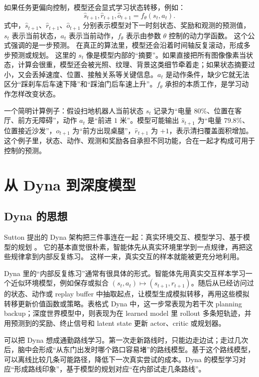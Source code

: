 \documentclass[11pt,a4paper]{ctexart}
\begin{document}
如果任务更偏向控制，模型还会显式学习状态转移，例如：
\begin{equation}
  \hat{s}_{t+1}, \hat{r}_{t+1}, \hat{o}_{t+1} = f_\theta(s_t, a_t).
\end{equation}
式中，$\hat{s}_{t+1}$、$\hat{r}_{t+1}$、$\hat{o}_{t+1}$ 分别表示模型对下一时刻状态、奖励和观测的预测值，$s_t$ 表示当前状态，$a_t$ 表示当前动作，$f_\theta$ 表示由参数 $\theta$ 控制的动力学函数。
这个公式强调的是一步预测。
在真正的算法里，模型还会沿着时间轴反复滚动，形成多步预测或规划。
这里的 $s_t$ 像是模型内部的“摘要”。如果直接把所有图像像素当状态，计算会很重，模型还会被光照、纹理、背景这类细节牵着走；如果状态摘要过小，又会丢掉速度、位置、接触关系等关键信息。$a_t$ 是动作条件，缺少它就无法区分“踩刹车后车速下降”和“踩油门后车速上升”。$f_\theta$ 承担的本质工作，是学习动作怎样改变状态。

一个简明计算例子：假设扫地机器人当前状态 $s_t$ 记录为“电量 $80\%$、位置在客厅、前方无障碍”，动作 $a_t$ 是“前进 $1$ 米”。模型可能输出 $\hat{s}_{t+1}$ 为“电量 $79.8\%$、位置接近沙发”，$\hat{o}_{t+1}$ 为“前方出现桌腿”，$\hat{r}_{t+1}$ 为 $+1$，表示清扫覆盖面积增加。这个例子里，状态、动作、观测和奖励各自承担不同功能，合在一起才构成可用于控制的预测。

\section{从 Dyna 到深度模型}

\subsection{Dyna 的思想}

Sutton 提出的 Dyna 架构把三件事连在一起：真实环境交互、模型学习、基于模型的规划 \cite{sutton1991dyna}。
它的基本直觉很朴素，智能体先从真实环境里学到一点规律，再把这些规律拿到内部反复练习。
这样一来，真实交互的样本就能被更充分地利用。

Dyna 里的“内部反复练习”通常有很具体的形式。智能体先用真实交互样本学习一个近似环境模型，例如保存或拟合 $(s_t,a_t)\mapsto(s_{t+1},r_{t+1})$。随后从已经访问过的状态、动作或 replay buffer 中抽取起点，让模型生成模拟转移，再用这些模拟转移更新价值函数或策略。表格式 Dyna 中，这一步常表现为若干次 planning backup；深度世界模型中，则表现为在 learned model 里 rollout 多条短轨迹，并用预测到的奖励、终止信号和 latent state 更新 actor、critic 或规划器。

可以把 Dyna 想成通勤路线学习。第一次走新路线时，只能边走边试；走过几次后，脑中会形成“从东门出发时哪个路口容易堵”的路线模型。基于这个路线模型，可以离线比较几条可能路径，降低下一次真实尝试的成本。Dyna 的模型学习对应“形成路线印象”，基于模型的规划对应“在内部试走几条路线”。
\end{document}
